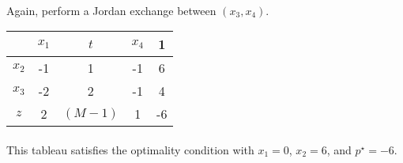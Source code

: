 \paragraph{}
Again, perform a Jordan exchange between $(x_3, x_4)$.
\begin{center}
	\begin{tabular}{ c | c  c  c | c }
		\      & $x_1$ &      $t$ & $x_4$ &   1 \\ \hline
		$x_2$  &    -1 &        1 &    -1 &   6 \\ 
		$x_3$  &    -2 &        2 &    -1 &   4 \\ \hline
		$z$    &     2 &  $(M-1)$ &     1 &  -6 \\
	\end{tabular}
\end{center}
\paragraph{}
This tableau satisfies the optimality condition with $x_1=0$, $x_2 =6$, and $p^\star=-6$.